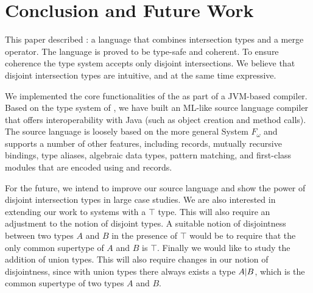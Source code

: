 \section{Conclusion and Future Work}
\label{sec:conclusion}

This paper described \name: a language that combines
intersection types and a merge operator.
The language is proved to be type-safe and coherent.
To ensure coherence the type system accepts only
disjoint intersections. We believe that disjoint intersection types are
intuitive, and at the same time expressive.

We implemented the core functionalities of the \name as part of a JVM-based
compiler. Based on the type system of \name, we have built an ML-like
source language compiler that offers interoperability with Java (such as object
creation and method calls). The source language is loosely based on the more
general System $F_{\omega}$ and supports a
number of other features, including records, mutually recursive
 bindings, type aliases, algebraic data types, pattern matching, and
first-class modules that are encoded using  and records.

For the future, we intend to improve our source language
and show the power of disjoint intersection types in large case studies.
We are also interested in extending our work
to systems with a $\top$ type. This will also require an adjustment
to the notion of disjoint types. A suitable notion of
disjointness between two types $A$ and $B$ in the presence of $\top$
would be to require that the only common supertype of $A$ and $B$ is $\top$.
Finally we would like to study the
addition of union types. This will also require changes in our
notion of disjointness, since with union types there always exists
a type $A | B$, which is the common supertype of two
types $A$ and $B$.


